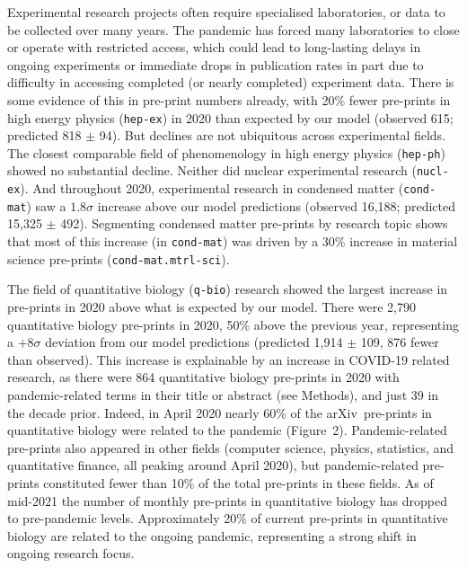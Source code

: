 \documentclass[a4paper,12pt]{article}
\newcommand{\arxiv}{arXiv}
\renewcommand*{\thefootnote}{\arabic{footnote}}
\begin{document}
Experimental research projects often require specialised laboratories, or data to be collected over many years. The pandemic has forced many laboratories to close or operate with restricted access\cite{PhysicsWorld,ScienceMag}, which could lead to long-lasting delays in ongoing experiments or immediate drops in publication rates in part due to difficulty in accessing completed (or nearly completed) experiment data. There is some evidence of this in pre-print numbers already, with {20\%} fewer pre-prints in high energy physics (\texttt{hep-ex}) in 2020 than expected by our model (observed 615; predicted 818 $\pm$ 94). But declines are not ubiquitous across experimental fields. The closest comparable field of phenomenology in high energy physics (\texttt{hep-ph}) showed no substantial decline. Neither did nuclear experimental research (\texttt{nucl-ex}). And throughout 2020, experimental research in condensed matter (\texttt{cond-mat}) saw a $1.8\sigma$ increase above our model predictions (observed 16,188; predicted 15,325 $\pm$ 492). Segmenting condensed matter pre-prints by research topic shows that most of this increase (in \texttt{cond-mat}) was driven by a 30\% increase in material science pre-prints (\texttt{cond-mat.mtrl-sci}).


The field of quantitative biology (\texttt{q-bio}) research showed the largest increase in pre-prints in 2020 above what is expected by our model. There were {2,790} quantitative biology pre-prints in 2020, {50\%} above the previous year, representing a $+8\sigma$ deviation from our model predictions (predicted 1,914 $\pm$ 109, 876 fewer than observed). This increase is explainable by an increase in COVID-19 related research, as there were 864 quantitative biology pre-prints in 2020 with pandemic-related terms in their title or abstract (see Methods), and just 39 in the decade prior. Indeed, in {April 2020} nearly 60\% of the \arxiv\ pre-prints in quantitative biology were related to the pandemic (Figure~2). Pandemic-related pre-prints also appeared in other fields (computer science, physics, statistics, and quantitative finance, all peaking around {April 2020}), but pandemic-related pre-prints constituted fewer than 10\% of the total pre-prints in these fields. As of mid-2021 the number of monthly pre-prints in quantitative biology has dropped to pre-pandemic levels. Approximately 20\% of current pre-prints in quantitative biology are related to the ongoing pandemic, representing a strong shift in ongoing research focus.
 
\renewcommand{\thefootnote}{$\dagger$} 
 
\end{document}
